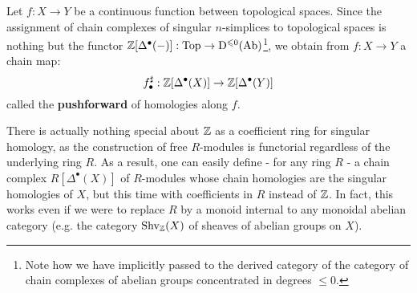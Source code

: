     	    \begin{remark} \label{remark: homology_pushforwards}
    	        Let $f: X \to Y$ be a continuous function between topological spaces. Since the assignment of chain complexes of singular $n$-simplices to topological spaces is nothing but the functor $\mathbb{Z}[\Delta^{\bullet}(-)]: \mathrm{Top} \to \mathrm{D}^{\leqslant 0}(\mathrm{Ab})$\footnote{Note how we have implicitly passed to the derived category of the category of chain complexes of abelian groups concentrated in degrees $\leq 0$.}, we obtain from $f: X \to Y$ a chain map:
    	            $$f^{\sharp}_{\bullet}: \mathbb{Z}[\Delta^{\bullet}(X)] \to \mathbb{Z}[\Delta^{\bullet}(Y)]$$
                called the \textbf{pushforward} of homologies along $f$. 
    	    \end{remark}
    	    \begin{remark}[Coefficients]
    	        There is actually nothing special about $\mathbb{Z}$ as a coefficient ring for singular homology, as the construction of free $R$-modules is functorial regardless of the underlying ring $R$. As a result, one can easily define - for any ring $R$ - a chain complex $R[\Delta^{\bullet}(X)]$ of $R$-modules whose chain homologies are the singular homologies of $X$, but this time with coefficients in $R$ instead of $\mathbb{Z}$. In fact, this works even if we were to replace $R$ by a monoid internal to any monoidal abelian category (e.g. the category $\mathrm{Shv}_{\mathbb{Z}}(X)$ of sheaves of abelian groups on $X$).
    	    \end{remark}
    	    
